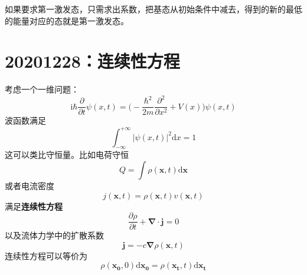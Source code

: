 \documentclass[12pt]{article}
\begin{document}
如果要求第一激发态，只需求出系数，把基态从初始条件中减去，得到的新的最低的能量对应的态就是第一激发态。

\section{20201228：连续性方程}

考虑一个一维问题：
\begin{equation*}
    \mathrm{i}\hbar \frac {\partial}{\partial t} \psi(x,t) = \bigg(-\frac {\hbar^2}{2m} \frac {\partial ^2}{\partial x^2} + V(x)\bigg)\psi(x,t)
\end{equation*}
波函数满足
\begin{equation*}
    \int_{-\infty}^{+\infty} |\psi(x,t)|^2 \mathrm{d}x = 1
\end{equation*}
这可以类比守恒量。比如电荷守恒
\begin{equation*}
    Q = \int \rho(\bm{x},t) \mathrm{d}\bm{x}
\end{equation*}
或者电流密度
\begin{equation*}
    j(\bm{x},t) = \rho(\bm{x},t)v(\bm{x},t)
\end{equation*}
满足\textbf{连续性方程}
\begin{equation*}
    \frac{\partial \rho}{\partial t} + \bm{\nabla} \cdot \bm{j} = 0
\end{equation*}
以及流体力学中的扩散系数
\begin{equation*}
    \bm{j} = -c \bm{\nabla}\rho(\bm{x},t)
\end{equation*}
连续性方程可以等价为
\begin{equation*}
    \rho(\bm{x_0},0)\mathrm{d}\bm{x_0} = \rho(\bm{x_t},t)\mathrm{d}\bm{x_t} 
\end{equation*}
\end{document}
